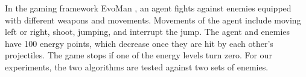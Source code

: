In the gaming framework EvoMan \cite{defranca2020evoman}, an agent fights against enemies equipped with different weapons and movements. Movements of the agent include moving left or right, shoot, jumping, and interrupt the jump. The agent and enemies have 100 energy points, which decrease once they are hit by each other's projectiles. The game stops if one of the energy levels turn zero. For our experiments, the two algorithms are tested against two sets of enemies.